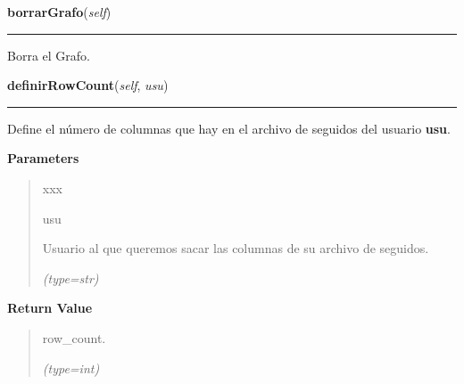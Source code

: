    \vspace{0.5ex}

\hspace{.8\funcindent}\begin{boxedminipage}{\funcwidth}

    \raggedright \textbf{borrarGrafo}(\textit{self})

    \vspace{-1.5ex}

    \rule{\textwidth}{0.5\fboxrule}
\setlength{\parskip}{2ex}
    Borra el Grafo.

\setlength{\parskip}{1ex}
    \end{boxedminipage}

    \label{grafo:Grafo:definirRowCount}

    \vspace{0.5ex}

\hspace{.8\funcindent}\begin{boxedminipage}{\funcwidth}

    \raggedright \textbf{definirRowCount}(\textit{self}, \textit{usu})

    \vspace{-1.5ex}

    \rule{\textwidth}{0.5\fboxrule}
\setlength{\parskip}{2ex}
    Define el número de columnas que hay en el archivo de seguidos del 
    usuario \textbf{usu}.

\setlength{\parskip}{1ex}
      \textbf{Parameters}
      \vspace{-1ex}

      \begin{quote}
        \begin{Ventry}{xxx}

          \item[usu]

          Usuario al que queremos sacar las columnas de su archivo de 
          seguidos.

            {\it (type=str)}

        \end{Ventry}

      \end{quote}

      \textbf{Return Value}
    \vspace{-1ex}

      \begin{quote}
      row\_count.

      {\it (type=int)}

      \end{quote}

    \end{boxedminipage}

